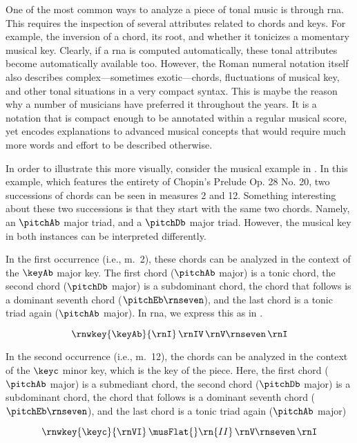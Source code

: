 
One of the most common ways to analyze a piece of tonal
music is through \gls{rna}. This requires the inspection of
several attributes related to chords and keys. For example,
the inversion of a chord, its root, and whether it tonicizes
a momentary musical key. Clearly, if a \gls{rna} is computed
automatically, these tonal attributes become automatically
available too. However, the Roman numeral notation itself
also describes complex---sometimes exotic---chords,
fluctuations of musical key, and other tonal situations in a
very compact syntax. This is maybe the reason why a number
of musicians have preferred it throughout the years. It is a
notation that is compact enough to be annotated within a
regular musical score, yet encodes explanations to advanced
musical concepts that would require much more words and
effort to be described otherwise.

In order to illustrate this more visually, consider the
musical example in . In this
example, which features the entirety of Chopin's Prelude Op.
28 No. 20, two successions of chords can be seen in measures
2 and 12. Something interesting about these two successions
is that they start with the same two chords. Namely, an
$\pitchAb$ major triad, and a $\pitchDb$ major triad.
However, the musical key in both instances can be
interpreted differently. 

In the first occurrence (i.e., m.~2), these chords can be
analyzed in the context of the $\keyAb$ major key. The first
chord ($\pitchAb$ major) is a tonic chord, the second chord
($\pitchDb$ major) is a subdominant chord, the chord that
follows is a dominant seventh chord ($\pitchEb\rnseven$),
and the last chord is a tonic triad again ($\pitchAb$
major). In \gls{rna}, we express this as in
.

\begin{equation}
    \label{eq:succession1}
    \rnwkey{\keyAb}{\rnI} \, \rnIV \, \rnV\rnseven \, \rnI
\end{equation}

In the second occurrence (i.e., m.~12), the chords can be
analyzed in the context of the $\keyc$ minor key, which is
the key of the piece. Here, the first chord ($\pitchAb$
major) is a submediant chord, the second chord ($\pitchDb$
major) is a subdominant chord, the chord that follows is a
dominant seventh chord ($\pitchEb\rnseven$), and the last
chord is a tonic triad again ($\pitchAb$ major)

\begin{equation}
    \label{eq:succession2}
    \rnwkey{\keyc}{\rnVI} \, \musFlat{}\rn{II} \, \rnV\rnseven \, \rnI
\end{equation}

